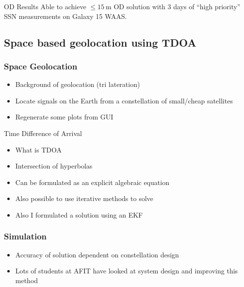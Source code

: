 \begin{frame}[t]
\begin{columns}
\begin{column}{0.5\textwidth}
\begin{center}
        \end{center}
    \end{column}
    \end{columns}
    \begin{block}{OD Results}
        Able to achieve \( \leq \SI{15}{\meter} \) OD solution with 3 days of ``high priority'' SSN measurements on Galaxy 15 WAAS.
    \end{block}
\end{frame}

\subsection[Space TDOA]{Space based geolocation using TDOA}

\begin{frame}[t]\frametitle{Space Geolocation}
    \begin{itemize}
        \item Background of geolocation (tri lateration)
        \item Locate signals on the Earth from a constellation of small/cheap satellites
        \item Regenerate some plots from GUI
    \end{itemize}

\end{frame}

\begin{frame}[t]{Time Difference of Arrival}
    \begin{itemize}
        \item What is TDOA
        \item Intersection of hyperbolas
        \item Can be formulated as an explicit algebraic equation
        \item Also possible to use iterative methods to solve
        \item Also I formulated a solution using an EKF
    \end{itemize}
\end{frame}

\begin{frame}[t]\frametitle{Simulation}
    
\begin{itemize}
    \item Accuracy of solution dependent on constellation design
    \item Lots of students at AFIT have looked at system design and improving this method
\end{itemize}
\end{frame}
